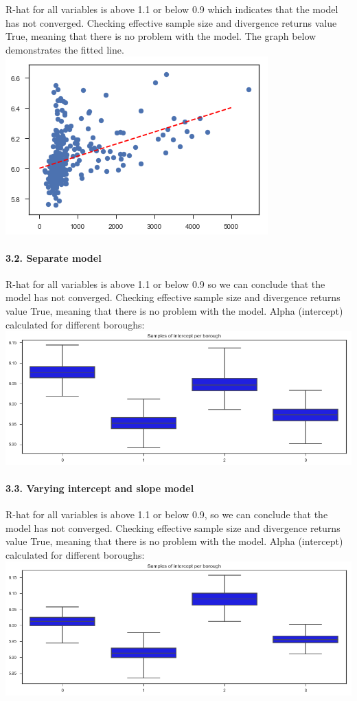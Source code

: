 \documentclass[11pt]{article}
\makeatletter
\def\maxwidth{\ifdim\Gin@nat@width>\linewidth\linewidth
    \else\Gin@nat@width\fi}
\let\Oldincludegraphics\includegraphics
\renewcommand{\includegraphics}[1]{\Oldincludegraphics[width=.8\maxwidth]{#1}}
\makeatother
\begin{document}
R-hat for all variables is above 1.1 or below 0.9 which indicates that
the model has not converged. Checking effective sample size and
divergence returns value True, meaning that there is no problem with the
model. The graph below demonstrates the fitted line.
\includegraphics{./Fig/nyc/PooledModel.png}

\paragraph{3.2. Separate model}\label{separate-model}

R-hat for all variables is above 1.1 or below 0.9 so we can conclude
that the model has not converged. Checking effective sample size and
divergence returns value True, meaning that there is no problem with the
model. Alpha (intercept) calculated for different boroughs:
\includegraphics{./Fig/nyc/Intercept_separate.png}

\paragraph{3.3. Varying intercept and slope
model}\label{varying-intercept-and-slope-model}

R-hat for all variables is above 1.1 or below 0.9, so we can conclude
that the model has not converged. Checking effective sample size and
divergence returns value True, meaning that there is no problem with the
model. Alpha (intercept) calculated for different boroughs:
\includegraphics{./Fig/nyc/Intercept_varymodel.png}
\end{document}
